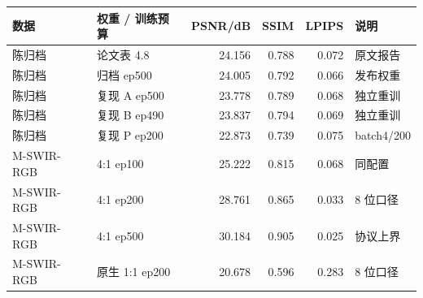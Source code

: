 \begin{tabular}{@{}llrrrl@{}}
\toprule
数据 & 权重 / 训练预算 & PSNR/dB & SSIM & LPIPS & 说明\\
\midrule
陈归档 & 论文表 4.8 & 24.156 & 0.788 & 0.072 & 原文报告\\
陈归档 & 归档 ep500 & 24.005 & 0.792 & 0.066 & 发布权重\\
陈归档 & 复现 A ep500 & 23.778 & 0.789 & 0.068 & 独立重训\\
陈归档 & 复现 B ep490 & 23.837 & 0.794 & 0.069 & 独立重训\\
陈归档 & 复现 P ep200 & 22.873 & 0.739 & 0.075 & batch4/200\\
\midrule
M-SWIR-RGB & 4:1 ep100 & 25.222 & 0.815 & 0.068 & 同配置\\
M-SWIR-RGB & 4:1 ep200 & 28.761 & 0.865 & 0.033 & 8 位口径\\
M-SWIR-RGB & 4:1 ep500 & 30.184 & 0.905 & 0.025 & 协议上界\\
M-SWIR-RGB & 原生 1:1 ep200 & 20.678 & 0.596 & 0.283 & 8 位口径\\
\bottomrule
\end{tabular}
